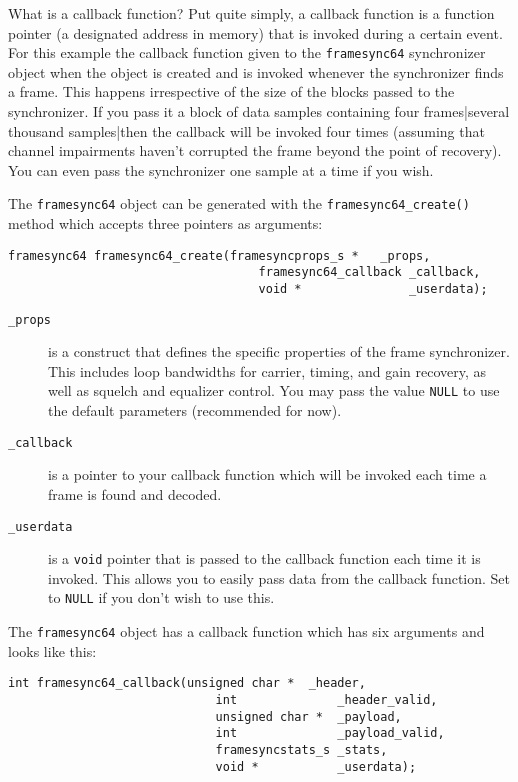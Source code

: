 What is a callback function?
Put quite simply, a callback function is a function pointer
(a designated address in memory)
that is invoked during a certain event.
For this example the callback function given to the {\tt framesync64}
synchronizer object when the object is created
and is invoked whenever the synchronizer finds a frame.
This happens irrespective of the size of the blocks passed to the
synchronizer.
If you pass it a block of data samples containing four frames|several
thousand samples|then the callback will be invoked four times
(assuming that channel impairments haven't corrupted the frame beyond
the point of recovery).
You can even pass the synchronizer one sample at a time if you wish.

The {\tt framesync64} object can be generated with the
{\tt framesync64\_create()} method which accepts three pointers as
arguments:
%
\begin{Verbatim}[fontsize=\small]
    framesync64 framesync64_create(framesyncprops_s *   _props,
                                   framesync64_callback _callback,
                                   void *               _userdata);
\end{Verbatim}
%
%
\begin{description}
\item[{\tt \_props}]
    is a construct that defines the specific properties of the frame
    synchronizer.
    This includes loop bandwidths for carrier, timing, and gain
    recovery, as well as squelch and equalizer control.
    You may pass the value {\tt NULL} to use the default parameters
    (recommended for now).
\item[{\tt \_callback}]
    is a pointer to your callback function which will be invoked each
    time a frame is found and decoded.
\item[{\tt \_userdata}]
    is a {\tt void} pointer that is passed to the callback function each
    time it is invoked.
    This allows you to easily pass data from the callback function.
    Set to {\tt NULL} if you don't wish to use this.
\end{description}
%
The {\tt framesync64} object has a callback function which has six
arguments and looks like this:
%
\begin{Verbatim}[fontsize=\small]
    int framesync64_callback(unsigned char *  _header,
                             int              _header_valid,
                             unsigned char *  _payload,
                             int              _payload_valid,
                             framesyncstats_s _stats,
                             void *           _userdata);
\end{Verbatim}
